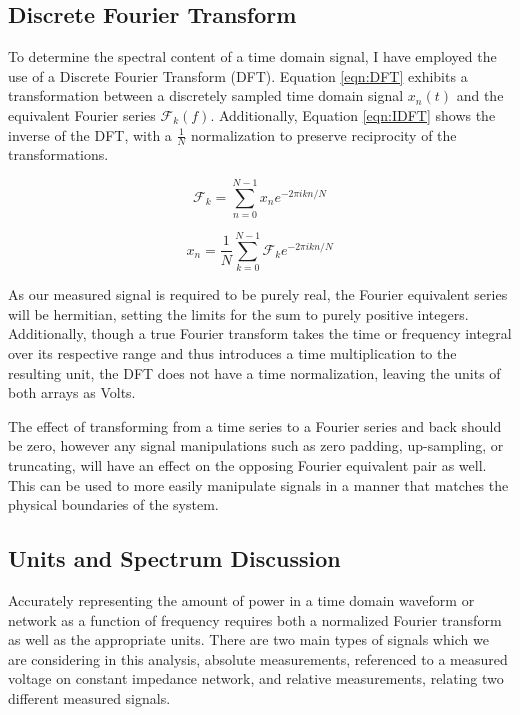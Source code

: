 \subsection{Discrete Fourier Transform}

	To determine the spectral content of a time domain signal, I have employed the use of a Discrete Fourier Transform (DFT).  Equation \ref{eqn:DFT} \cite{DFT} exhibits a transformation between a discretely sampled time domain signal $x_{n}(t)$ and the equivalent Fourier series $\mathcal{F}_{k}(f)$.  Additionally, Equation \ref{eqn:IDFT} \cite{DFT} shows the inverse of the DFT, with a $\frac{1}{N}$ normalization to preserve reciprocity of the transformations.

\begin{equation}
\mathcal{F}_{k} = \sum_{n=0}^{N-1} x_{n}e^{-2\pi ikn/N}
\label{eqn:DFT}
\end{equation}

\begin{equation}
x_{n} = \frac{1}{N}\sum_{k=0}^{N-1} \mathcal{F}_{k}e^{-2\pi ikn/N}
\label{eqn:IDFT}
\end{equation}


As our measured signal is required to be purely real, the Fourier equivalent series will be hermitian, setting the limits for the sum to purely positive integers.  Additionally, though a true Fourier transform takes the time or frequency integral over its respective range and thus introduces a time multiplication to the resulting unit, the DFT does not have a time normalization, leaving the units of both arrays as Volts.

The effect of transforming from a time series to a Fourier series and back should be zero, however any signal manipulations such as zero padding, up-sampling, or truncating, will have an effect on the opposing Fourier equivalent pair as well.  This can be used to more easily manipulate signals in a manner that matches the physical boundaries of the system.


\subsection{Units and Spectrum Discussion}

	Accurately representing the amount of power in a time domain waveform or network as a function of frequency requires both a normalized Fourier transform as well as the appropriate units.  There are two main types of signals which we are considering in this analysis, absolute measurements, referenced to a measured voltage on constant impedance network, and relative measurements, relating two different measured signals.  
	
